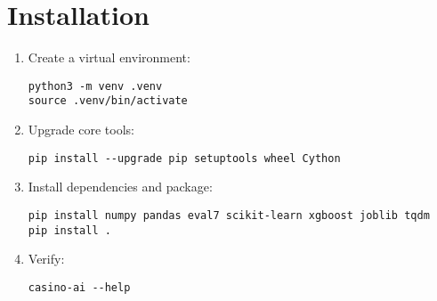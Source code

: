 \section{Installation}
\begin{enumerate}
  \item Create a virtual environment:
  \begin{verbatim}
python3 -m venv .venv
source .venv/bin/activate
  \end{verbatim}
  \item Upgrade core tools:
  \begin{verbatim}
pip install --upgrade pip setuptools wheel Cython
  \end{verbatim}
  \item Install dependencies and package:
  \begin{verbatim}
pip install numpy pandas eval7 scikit-learn xgboost joblib tqdm
pip install .
  \end{verbatim}
  \item Verify:
  \begin{verbatim}
casino-ai --help
  \end{verbatim}
\end{enumerate}
